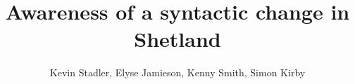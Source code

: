 \documentclass[a4paper,12pt]{article}
\title{Awareness of a syntactic change in Shetland}
\author{Kevin Stadler, Elyse Jamieson, Kenny Smith, Simon Kirby}
\begin{document}
\maketitle

\begin{abstract}
\end{abstract}
\tableofcontents
\newpage





\end{document}
